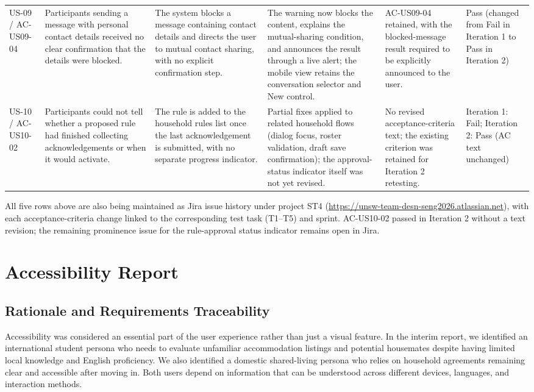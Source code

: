 \documentclass[11pt,a4paper]{article}
\begin{document}
{\begin{longtable}{@{}L{2.1cm}L{3.0cm}L{2.6cm}L{2.9cm}L{2.6cm}L{1.6cm}@{}}
    US-09 / AC-US09-04 &
    Participants sending a message with personal contact details received
    no clear confirmation that the details were blocked. &
    The system blocks a message containing contact details and directs the
    user to mutual contact sharing, with no explicit confirmation step. &
    The warning now blocks the content, explains the mutual-sharing
    condition, and announces the result through a live alert; the mobile
    view retains the conversation selector and New control. &
    AC-US09-04 retained, with the blocked-message result required to be
    explicitly announced to the user. &
    Pass (changed from Fail in Iteration 1 to Pass in Iteration 2)\\

    US-10 / AC-US10-02 &
    Participants could not tell whether a proposed rule had finished
    collecting acknowledgements or when it would activate. &
    The rule is added to the household rules list once the last
    acknowledgement is submitted, with no separate progress indicator. &
    Partial fixes applied to related household flows (dialog focus, roster
    validation, draft save confirmation); the approval-status indicator
    itself was not yet revised. &
    No revised acceptance-criteria text; the existing criterion was retained
    for Iteration 2 retesting. &
    Iteration 1: Fail; Iteration 2: Pass (AC text unchanged)\\

\end{longtable}
}

All five rows above are also being maintained as Jira issue history under
project ST4 (\url{https://unsw-team-desn-seng2026.atlassian.net}), with each
acceptance-criteria change linked to the corresponding test task (T1--T5) and
sprint. AC-US10-02 passed in Iteration 2 without a text revision; the remaining
prominence issue for the rule-approval status indicator remains open in Jira.

\section{Accessibility Report}
\label{secaccessibilityreport}

\subsection{Rationale and Requirements Traceability}
\label{subseca11yrationale}

Accessibility was considered an essential part of the user experience rather than
just a visual feature. In the interim report, we identified an international student persona
who needs to evaluate unfamiliar accommodation listings and potential housemates
despite having limited local knowledge and English proficiency. We also identified
a domestic shared-living persona who relies on household agreements remaining
clear and accessible after moving in. Both users depend on information that can
be understood across different devices, languages, and interaction methods.
\end{document}
